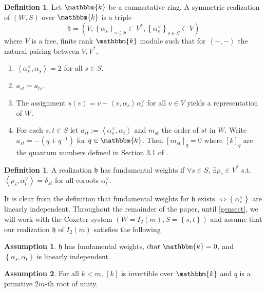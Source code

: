 \documentclass[10pt]{article}
\numberwithin{theorem}{section}
\theoremstyle{definition}
\newtheorem{definition}[theorem]{Definition}
\newtheorem{assumption}{Assumption}
\newcommand{\kb}{\mathbbm{k}}
\newcommand{\hf}{\mathfrak{h}}
\newcommand{\abrac}[1]{\left\langle#1\right\rangle}
\newcommand{\set}[1]{\left \{ #1 \right \}}
\newcommand{\0}{\ \raisebox{-2ex}{\begin{tikzpicture}[xscale=0.25,yscale=0.3,thick,baseline]
 \draw (0,0) -- (0,3); 
\end{tikzpicture}}}
\renewcommand{\1}{\ \raisebox{-2ex}{\begin{tikzpicture}[xscale=0.25,yscale=0.3,thick,baseline]
 \draw (0,0) -- (0,1);
 \draw (0,2) -- (0,3);
 \node[dot] at (0,1) {};
  \node[dot] at (0,2) {};
\end{tikzpicture}}}
\begin{document}
\begin{definition}
Let $\kb$ be a commutative ring. A symmetric realization of $(W,S)$ over $\kb$ is a triple $$\hf=(V, \set{\alpha_s}_{s\in S}\subset V^*, \set{\alpha_s^\vee}_{s\in S}\subset V)$$ where $V$ is a free, finite rank $\kb$ module such that for $\abrac{-,-}$ the natural pairing between $V, V^*$,                                                                                                                                                                                                                                             
\begin{enumerate}[(1)]
    \item $\abrac{\alpha_s^\vee, \alpha_s}=2$ for all $s\in S$.
    \item $a_{st}=a_{ts}$.
    \item The assignment $s(v)=v-\abrac{v, \alpha_s} \alpha_s^\vee$ for all $v\in V$ yields a representation of $W$.
    \item For each $s,t\in S$ let $a_{st}:=\abrac{\alpha_s^\vee, \alpha_t}$ and $m_{st}$ the order of $st$ in $W$. Write $a_{st}=-(q+q^{-1})$ for $q\in \kb$. Then $[m_{st}]_{q}=0$ where $[k]_q$ are the quantum numbers defined in Section 3.1 of \cite{DC}.
\end{enumerate}
\end{definition}

\begin{definition}
    A realization $\hf$ has fundamental weights if $\forall s\in S$, $\exists \rho_s\in V^*$ s.t. $\abrac{\rho_s, \alpha_t^\vee}=\delta_{st}$ for all coroots $\alpha_t^\vee$.
\end{definition}

It is clear from the definition that fundamental weights for $\hf$ exists $\iff \set{\alpha_s^\vee}$ are linearly independent. Throughout the remainder of the paper, until \cref{gensect}, we will work with the Coxeter system $(W=I_2(m), S=\set{s,t})$ and assume that our realization $\hf$ of $I_2(m)$ satisfies the following

\begin{assumption}
\label{asump1}
     $\hf$  has fundamental weights, $\mathrm{char}\ \kb=0$, and $\set{\alpha_s, \alpha_t}$ is linearly independent.
\end{assumption}

\begin{assumption}
\label{asump2}
    For all $k<m$, $[k]$ is invertible over $\kb$ and $q$ is a primitive $2m$-th root of unity. 
\end{assumption}
\end{document}
